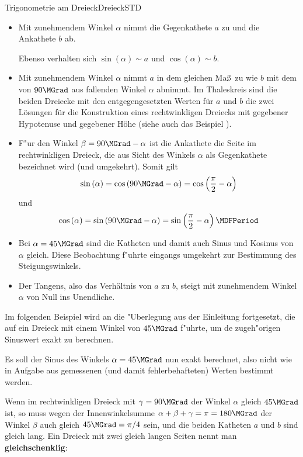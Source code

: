 \begin{MXContent}{Trigonometrie am Dreieck}{Dreieck}{STD}
\begin{itemize}
\item Mit zunehmendem Winkel $\alpha$ nimmt die Gegenkathete $a$ zu und die 
Ankathete $b$ ab.

Ebenso verhalten sich $\sin\left(\alpha\right)\sim a$ und 
$\cos\left(\alpha\right)\sim b$.

\item Mit zunehmendem Winkel $\alpha$ nimmt $a$ in dem gleichen Ma\ss\ zu 
wie $b$ mit dem von $90\MGrad$ aus fallenden Winkel $\alpha$ abnimmt. Im 
Thaleskreis sind die beiden Dreiecke mit den entgegengesetzten Werten 
f\"ur $a$ und $b$ die zwei L\"osungen f\"ur die Konstruktion eines 
rechtwinkligen Dreiecks mit gegebener Hypotenuse und gegebener H\"ohe 
(siehe auch das Beispiel ).

\item
F"ur den Winkel $\beta = 90\MGrad - \alpha$ ist die Ankathete die Seite im
rechtwinkligen Dreieck, die aus Sicht des Winkels $\alpha$ als Gegenkathete
bezeichnet wird (und umgekehrt). Somit gilt
\[
\sin\left(\alpha\right)=\cos\left(90\MGrad-\alpha\right) %
 = \cos\left(\frac{\pi}{2}-\alpha\right) %
\]
und 
\[
\cos\left(\alpha\right) = \sin\left(90\MGrad-\alpha\right) %
 = \sin\left(\frac{\pi}{2}-\alpha\right) \MDFPeriod %
\]
%
\item Bei $\alpha=45\MGrad$ sind die Katheten und damit auch Sinus und Kosinus 
von $\alpha$ gleich. Diese Beobachtung f"uhrte eingangs umgekehrt zur Bestimmung
des Steigungswinkels.

\item Der Tangens, also das Verh\"altnis von $a$ zu $b$, steigt mit zunehmendem 
Winkel $\alpha$ von Null ins {\glqq}Unendliche{\grqq}. 
\end{itemize}

Im folgenden Beispiel wird an die "Uberlegung aus der Einleitung fortgesetzt, 
die auf ein Dreieck mit einem Winkel von $45\MGrad$ f"uhrte, um de zugeh"origen
Sinuswert exakt zu berechnen.

\begin{MExample}
Es soll der Sinus des Winkels $\alpha=45\MGrad$ nun exakt berechnet, also 
nicht wie in Aufgabe  aus 
gemessenen (und damit fehlerbehafteten) Werten bestimmt werden.

Wenn im rechtwinkligen Dreieck mit $\gamma=90\MGrad$ der Winkel $\alpha$ gleich $45\MGrad$ ist, so muss wegen der Innenwinkelsumme $\alpha+\beta+\gamma=\pi=180\MGrad$ der Winkel $\beta$ auch gleich $45\MGrad=\pi/4$ sein, und die beiden Katheten $a$ und $b$ sind gleich lang. Ein Dreieck mit zwei gleich langen Seiten nennt man \textbf{gleichschenklig}:


\end{MExample}
\end{MXContent}

